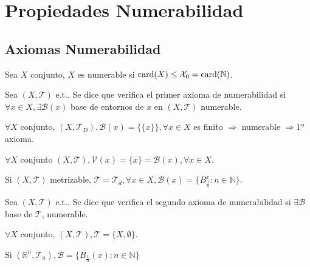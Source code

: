 \chapter{Propiedades Numerabilidad}

\section{Axiomas Numerabilidad}

\begin{defn}[Numerable]
  Sea $X$ conjunto, $X$ es numerable si $\operatorname{card}(X) \leq \mathcal{X}_{0} = \operatorname{card}(\mathbb{N})$.
\end{defn}

\begin{defn}
  Sea $( X, \mathcal{T} )$ e.t.. Se dice que verifica el primer axioma de numerabilidad si $\forall x \in X, \exists \mathcal{B}(x)$ base de entornos de $x$ en $( X, \mathcal{T} )$ numerable.
\end{defn}

\begin{ejm}
  $\forall X$ conjunto, $( X, \mathcal{T}_{D} ), \mathcal{B} (x) = \{ \{ x \} \}, \forall x \in X$ es finito $\Rightarrow$ numerable $\Rightarrow 1º $ axioma.
\end{ejm}

\begin{ejm}
  $\forall X $ conjunto $( X, \mathcal{T} ), \mathcal{V}(x) = \{ x \} = \mathcal{B} (x), \forall x \in X$.
\end{ejm}

\begin{ejm}
  Si $( X, \mathcal{T} )$ metrizable, $\mathcal{T} = \mathcal{T}_{d}, \forall x \in X, \mathcal{B} (x) = \{  B_{\frac{1}{n}}^x : n \in \mathbb{N} \}$.
\end{ejm}

\begin{defn}
  Sea $( X, \mathcal{T} )$ e.t.. Se dice que verifica el segundo axioma de numerabilidad si $ \exists \mathcal{B}$ base de $\mathcal{T}$, numerable.
\end{defn}

\begin{ejm}
  $\forall X$ conjunto, $( X, \mathcal{T} ), \mathcal{T} = \{  X, \emptyset \}$.
\end{ejm}

\begin{ejm}
  Si $( \mathbb{R}^{n}, \mathcal{T}_{u} ), \mathcal{B} = \{ B_{\frac{1}{n}}(x) : n \in \mathbb{N} \}$
\end{ejm}

